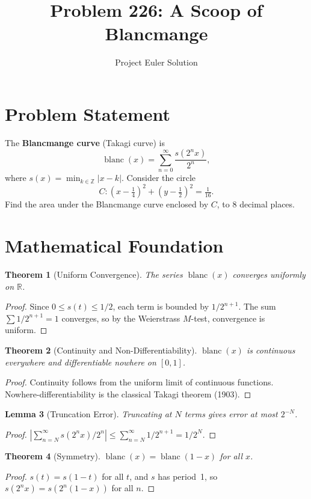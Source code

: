 \documentclass[12pt]{article}
\title{Problem 226: A Scoop of Blancmange}
\author{Project Euler Solution}
\date{}
\newtheorem{theorem}{Theorem}
\newtheorem{lemma}[theorem]{Lemma}
\begin{document}
\maketitle

\section{Problem Statement}
The \textbf{Blancmange curve} (Takagi curve) is
\[
\operatorname{blanc}(x) = \sum_{n=0}^{\infty} \frac{s(2^n x)}{2^n},
\]
where $s(x) = \min_{k \in \mathbb{Z}} |x - k|$. Consider the circle
\[
C: \left(x - \tfrac{1}{4}\right)^2 + \left(y - \tfrac{1}{2}\right)^2 = \tfrac{1}{16}.
\]
Find the area under the Blancmange curve enclosed by $C$, to 8 decimal places.

\section{Mathematical Foundation}

\begin{theorem}[Uniform Convergence]
The series $\operatorname{blanc}(x)$ converges uniformly on $\mathbb{R}$.
\end{theorem}
\begin{proof}
Since $0 \leq s(t) \leq 1/2$, each term is bounded by $1/2^{n+1}$. The sum $\sum 1/2^{n+1} = 1$ converges, so by the Weierstrass $M$-test, convergence is uniform.
\end{proof}

\begin{theorem}[Continuity and Non-Differentiability]
$\operatorname{blanc}(x)$ is continuous everywhere and differentiable nowhere on $[0,1]$.
\end{theorem}
\begin{proof}
Continuity follows from the uniform limit of continuous functions. Nowhere-differentiability is the classical Takagi theorem (1903).
\end{proof}

\begin{lemma}[Truncation Error]
Truncating at $N$ terms gives error at most $2^{-N}$.
\end{lemma}
\begin{proof}
$\left|\sum_{n=N}^{\infty} s(2^n x)/2^n\right| \leq \sum_{n=N}^{\infty} 1/2^{n+1} = 1/2^N$.
\end{proof}

\begin{theorem}[Symmetry]
$\operatorname{blanc}(x) = \operatorname{blanc}(1-x)$ for all $x$.
\end{theorem}
\begin{proof}
$s(t) = s(1-t)$ for all $t$, and $s$ has period~1, so $s(2^n x) = s(2^n(1-x))$ for all $n$.
\end{proof}
\end{document}
